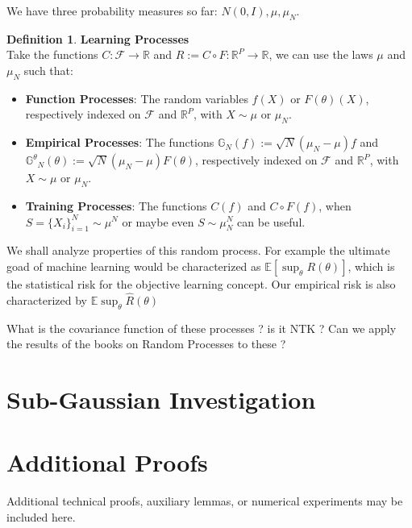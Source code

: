 \documentclass[11pt, a4paper]{article}
\theoremstyle{definition}
\newtheorem{definition}[theorem]{Definition}
\theoremstyle{remark}
\newcommand{\R}{\mathbb{R}}
\newcommand{\E}{\mathbb{E}}
\begin{document}
We have three probability measures so far: \(N(0,I), \mu, \mu_N\).
\begin{definition}{\textbf{Learning Processes}}\\
Take the functions \(C:\mathcal{F}\to \R\) and \(R:= C\circ F : \R^P \to \R\), we can use the laws \(\mu\) and \(\mu_N\) such that:
\begin{itemize}
	\item \textbf{Function Processes}: The random variables \(f(X)\) or \(F(\theta)(X)\), respectively indexed on \(\mathcal{F}\) and \(\R^P\), with \(X\sim\mu\) or \(\mu_N\).
	
	\item \textbf{Empirical Processes}: The functions \(\mathbb{G}_N(f):=\sqrt{N}(\mu_N - \mu)f\) and  \(\mathbb{G^\theta}_N(\theta):=\sqrt{N}(\mu_N - \mu)F(\theta)\), respectively indexed on \(\mathcal{F}\) and \(\R^P\), with \(X\sim\mu\) or \(\mu_N\).
	
	\item \textbf{Training Processes}: The functions \(C(f)\) and \(C \circ F(f)\), when \(S=\{X_i\}_{i=1}^N \sim \mu^N\) or maybe even \(S\sim \mu_N^N\) can be useful.
	
	
\end{itemize}
\end{definition}

We shall analyze properties of this random process. For example the ultimate goad of machine learning would be characterized as \(\E[\sup_{\theta} R(\theta)]\), which is the statistical risk for the objective learning concept. Our empirical risk is also characterized by \(\E\sup_{\theta} \hat{R}(\theta)\)

What is the covariance function of these processes ? is it NTK ?
 Can we apply the results of the books on Random Processes to these ?

	
\section{Sub-Gaussian Investigation}
	
		
	
	
	
	
	\appendix
	
	\section{Additional Proofs}
	\label{sec:appendix}
	Additional technical proofs, auxiliary lemmas, or numerical experiments may be included here.
	
\end{document}
